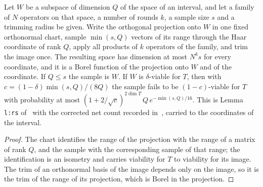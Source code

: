 \begin{lemma}
    \label{lem:canonical_sampled_parent}
    \leanok
    Let $W$ be a subspace of dimension $Q$ of the space of an interval, and
    let a family of $N$ operators on that space, a number of rounds $k$, a
    sample size $s$ and a trimming radius be given. Write the orthogonal
    projection onto $W$ in one fixed orthonormal chart, sample $\min(s,Q)$
    vectors of its range through the Haar coordinate of rank $Q$, apply all
    products of $k$ operators of the family, and trim the image once. The
    resulting space has dimension at most $N^ks$ for every coordinate, and it
    is a Borel function of the projection onto $W$ and of the coordinate.
    If $Q\le s$ the sample is $W$. If $W$ is $\delta$-viable for $T$, then
    with $c=(1-\delta)\min(s,Q)/(8Q)$ the sample fails to be
    $(1-c)$-viable for $T$ with probability at most
    $(1+2/\sqrt c)^{2\dim T}\,Q\,e^{-\min(s,Q)/16}$. This is Lemma
    \texttt{l:rs} of~\cite[lines 530--558]{Arad2016RigorousRG} with the
    corrected net count recorded in~\cite{gap:alvv16_random_sampling_net_count},
    carried to the coordinates of the interval.
\end{lemma}
\begin{proof}\leanok
    The chart identifies the range of the projection with the range of a
    matrix of rank $Q$, and the sample with the corresponding sample of that
    range; the identification is an isometry and carries viability for $T$
    to viability for its image. The trim of an orthonormal basis of the
    image depends only on the image, so it is the trim of the range of its
    projection, which is Borel in the projection.
\end{proof}

